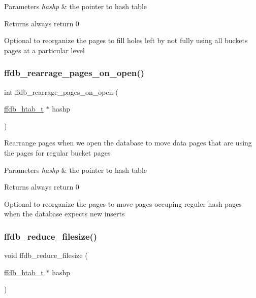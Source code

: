 \begin{DoxyParams}{Parameters}
{\em hashp} & the pointer to hash table\\
\hline
\end{DoxyParams}
\begin{DoxyReturn}{Returns}
always return 0
\end{DoxyReturn}
Optional to reorganize the pages to fill holes left by not fully using all buckets pages at a particular level \mbox{\label{adat-devel_2other__libs_2filedb_2filehash_2ffdb__hash_8h_a74b695499c18e8c1739c945a84cb675a}} 
\subsubsection{\texorpdfstring{ffdb\_rearrage\_pages\_on\_open()}{ffdb\_rearrage\_pages\_on\_open()}}
{\footnotesize\ttfamily int ffdb\+\_\+rearrage\+\_\+pages\+\_\+on\+\_\+open (\begin{DoxyParamCaption}\item[{\mbox{\hyperlink{adat-devel_2other__libs_2filedb_2filehash_2ffdb__hash_8h_ae592010ed2bedc975d3cc0b7d074b9d1}{ffdb\+\_\+htab\+\_\+t}} $\ast$}]{hashp }\end{DoxyParamCaption})}

Rearrange pages when we open the database to move data pages that are using the pages for regular bucket pages


\begin{DoxyParams}{Parameters}
{\em hashp} & the pointer to hash table\\
\hline
\end{DoxyParams}
\begin{DoxyReturn}{Returns}
always return 0
\end{DoxyReturn}
Optional to reorganize the pages to move pages occuping reguler hash pages when the database expects new inserts \mbox{\label{adat-devel_2other__libs_2filedb_2filehash_2ffdb__hash_8h_a89850b387b69a4649b1bd92d0e3c5d12}} 
\subsubsection{\texorpdfstring{ffdb\_reduce\_filesize()}{ffdb\_reduce\_filesize()}}
{\footnotesize\ttfamily void ffdb\+\_\+reduce\+\_\+filesize (\begin{DoxyParamCaption}\item[{\mbox{\hyperlink{adat-devel_2other__libs_2filedb_2filehash_2ffdb__hash_8h_ae592010ed2bedc975d3cc0b7d074b9d1}{ffdb\+\_\+htab\+\_\+t}} $\ast$}]{hashp }\end{DoxyParamCaption})}

